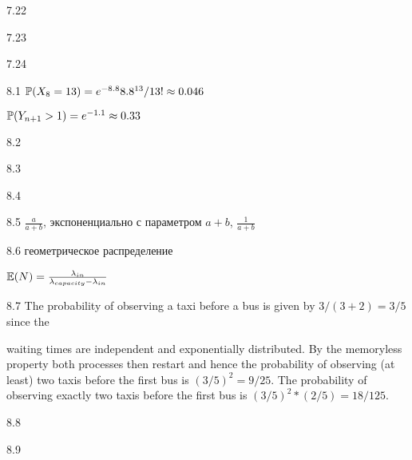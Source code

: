 \protect \hypertarget {soln:7.22}{}
\begin{solution}{{7.22}}
\end{solution}
\protect \hypertarget {soln:7.23}{}
\begin{solution}{{7.23}}
\end{solution}
\protect \hypertarget {soln:7.24}{}
\begin{solution}{{7.24}}
\end{solution}
\protect \hypertarget {soln:8.1}{}
\begin{solution}{{8.1}}
  $\P(X_8=13)=e^{-8.8}8.8^{13}/13!\approx 0.046$

  $\P(Y_{n+1}>1)=e^{-1.1}\approx 0.33$
\end{solution}
\protect \hypertarget {soln:8.2}{}
\begin{solution}{{8.2}}
\end{solution}
\protect \hypertarget {soln:8.3}{}
\begin{solution}{{8.3}}
\end{solution}
\protect \hypertarget {soln:8.4}{}
\begin{solution}{{8.4}}
\end{solution}
\protect \hypertarget {soln:8.5}{}
\begin{solution}{{8.5}}
$\frac{a}{a+b}$, экспоненциально с параметром $a+b$, $\frac{1}{a+b}$
\end{solution}
\protect \hypertarget {soln:8.6}{}
\begin{solution}{{8.6}}
  геометрическое распределение

  $\E(N)=\frac{\lambda_{in}}{\lambda_{capacity}-\lambda_{in}}$
\end{solution}
\protect \hypertarget {soln:8.7}{}
\begin{solution}{{8.7}}
  The probability of observing a taxi before a bus is given by $3/(3+2)=3/5$ since the

  waiting times are independent and exponentially distributed. By the memoryless
  property both processes then restart and hence the probability of observing (at least)
  two taxis before the first bus is $(3/5)^2=9/25$. The probability of observing exactly
  two taxis before the first bus is $(3/5)^2*(2/5)=18/125$.
\end{solution}
\protect \hypertarget {soln:8.8}{}
\begin{solution}{{8.8}}
\end{solution}
\protect \hypertarget {soln:8.9}{}
\begin{solution}{{8.9}}
\end{solution}
